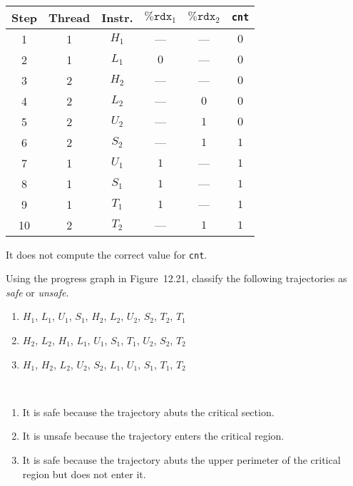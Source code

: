 \documentclass[12pt]{article}
\newenvironment{ex}[2][Exercise]{\begin{trivlist}
		\item[\hskip \labelsep {\bfseries #1}\hskip \labelsep {\bfseries #2.}]}{\end{trivlist}}
\newenvironment{sol}[1][Solution]{\begin{trivlist}
		\item[\hskip \labelsep {\bfseries #1:}]}{\end{trivlist}}
\begin{document}
\begin{sol}
	\
	\begin{center}
		\begin{tabular}{cccccc}
			Step & Thread & Instr. & $\texttt{\%rdx}_1$ & $\texttt{\%rdx}_2$ & \texttt{cnt}\\
			\hline
			1 & 1 & $H_1$ & --- & --- & $0$\\
			2 & 1 & $L_1$ & $0$ & --- & $0$ \\
			
			3 & 2 & $H_2$ & --- & --- & $0$ \\
			
			4 & 2 & $L_2$ & --- & $0$ & $0$\\
			
			5 & 2 & $U_2$ & --- & $1$ & $0$ \\
			
			6 & 2 & $S_2$ & --- & $1$ & $1$ \\
			
			7 & 1 & $U_1$ & $1$ & --- & $1$ \\
			
			8 & 1 & $S_1$ & $1$ & --- & $1$\\
			
			9 & 1 & $T_1$ & $1$ & --- & $1$ \\
			
			10 & 2 & $T_2$ & --- & $1$ & $1$ \\
		\end{tabular}
	\end{center}
	It does not compute the correct value for \texttt{cnt}.
\end{sol}

\begin{ex}{12.8}
	Using the progress graph in Figure~12.21, classify the following trajectories as \emph{safe}
	or \emph{unsafe}.
	\begin{enumerate}[label=(\alph*)]
		\item $H_1$, $L_1$, $U_1$, $S_1$, $H_2$, $L_2$, $U_2$, $S_2$, $T_2$, $T_1$
		\item $H_2$, $L_2$, $H_1$, $L_1$, $U_1$, $S_1$, $T_1$, $U_2$, $S_2$, $T_2$
		\item $H_1$, $H_2$, $L_2$, $U_2$, $S_2$, $L_1$, $U_1$, $S_1$, $T_1$, $T_2$
	\end{enumerate}
\end{ex}

\begin{sol}
	\
	\begin{enumerate}
		\item It is safe because the trajectory abuts the critical section.
		\item It is unsafe because the trajectory enters the critical region.
		\item It is safe because the trajectory abuts the upper perimeter of the critical
		region but does not enter it.
	\end{enumerate}
\end{sol}
\end{document}
